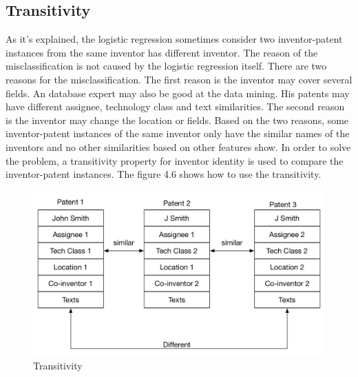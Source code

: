 \subsection{Transitivity}
As it's explained, the logistic regression sometimes consider two inventor-patent instances from the same inventor has different inventor. The reason of the misclassification is not caused by the logistic regression itself. There are two reasons for the misclassification. The first reason is the inventor may cover several fields. An database expert may also be good at the data mining. His patents may have different assignee, technology class and text similarities. The second reason is the inventor may change the location or fields. Based on the two reasons, some inventor-patent instances of the same inventor only have the similar names of the inventors and no other similarities based on other features show. In order to solve the problem, a transitivity property for inventor identity is used to compare the inventor-patent instances. The figure 4.6 shows how to use the transitivity. 
\begin{figure}
\begin{center}
\includegraphics[scale=0.7]{Transitivity.pdf}
\caption{Transitivity}
\end{center}
\end{figure}
